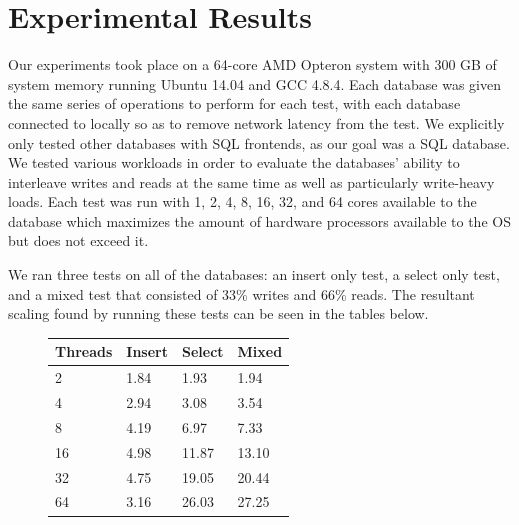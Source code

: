 \documentclass[conference, compsoc]{IEEEtran}
\begin{document}
\section{Experimental Results}
Our experiments took place on a 64-core AMD Opteron system with 300 GB of system memory running Ubuntu 14.04 and 
GCC 4.8.4. Each database was given the same series of operations to perform for each test, with each database 
connected to locally so as to remove network latency from the test. We explicitly only tested other databases
with SQL frontends, as our goal was a SQL database. We tested various workloads in order to evaluate 
the databases' ability to interleave writes and reads at the same time as well as particularly write-heavy 
loads. Each test was run with 1, 2, 4, 8, 16, 32, and 64 cores available to the database which maximizes the amount of hardware processors
available to the OS but does not exceed it. 
\par\vspace{\baselineskip}
We ran three tests on all of the databases: an insert only test, a select only test, and
a mixed test that consisted of 33\% writes and 66\% reads.
The resultant scaling found by running these tests can be seen in the tables below. 

\par\vspace{\baselineskip}
\begin{figure}[H]
\begin{center}
 \label{tab:omdbScaling}
  \begin{tabular}{  l  l  l  l }
    \midrule
    \bf Threads & \bf Insert & \bf Select & \bf Mixed \\ \midrule
     2 & 1.84 & 1.93 & 1.94 \\ \midrule
     4 & 2.94 & 3.08 & 3.54 \\ \midrule
     8 & 4.19 & 6.97 & 7.33 \\ \midrule
     16 & 4.98 & 11.87 & 13.10 \\ \midrule
     32 & 4.75 & 19.05 & 20.44 \\ \midrule
     64 & 3.16 & 26.03 & 27.25 \\ \midrule
  \end{tabular}
\end{center}
\end{figure}
\end{document}
